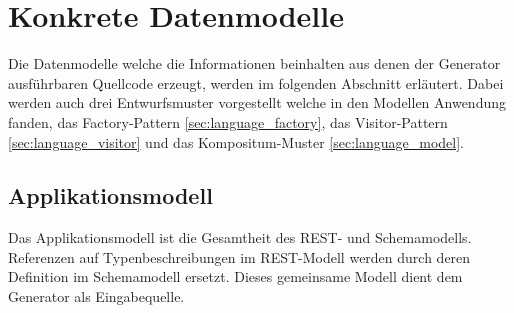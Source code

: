 \section{Konkrete Datenmodelle}
\label{sec:concrete_model}

Die Datenmodelle welche die Informationen beinhalten aus denen der Generator ausführbaren Quellcode erzeugt, werden im folgenden Abschnitt erläutert. Dabei werden auch drei Entwurfsmuster vorgestellt welche in den Modellen Anwendung fanden, das Factory-Pattern \cref{sec:language_factory}, das Visitor-Pattern \cref{sec:language_visitor} und das Kompositum-Muster \cref{sec:language_model}.





\subsection{Applikationsmodell}
\label{sec:application_model}

Das Applikationsmodell ist die Gesamtheit des REST- und Schemamodells. Referenzen auf Typenbeschreibungen im REST-Modell werden durch deren Definition im Schemamodell ersetzt. Dieses gemeinsame Modell dient dem Generator als Eingabequelle.

